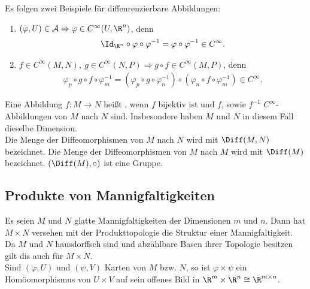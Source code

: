 \begin{bsp}
  Es folgen zwei Beispiele für diffenrenzierbare Abbildungen:
  \begin{enumerate}
  \item $(\varphi,U) \in \mathcal A \Rightarrow \varphi \in C^{\infty}(U,\R^n)$, denn
    \begin{align*}
      \Id_{\R^n}\circ \varphi \circ \varphi^{-1} = \varphi \circ \varphi^{-1} \in C^{\infty}.
    \end{align*}
  \item $f \in C^{\infty}(M,N), \ g \in C^{\infty}(N,P) \Rightarrow g \circ f \in C^{\infty}(M,P)$, denn
    \begin{align*}
      \varphi_p \circ g \circ f \circ \varphi^{-1}_m = (\varphi_p \circ g \circ \varphi_n^{-1}) \circ (\varphi_n \circ f \circ \varphi_m^{-1}) \in C^{\infty}.
    \end{align*}
  \end{enumerate}
\end{bsp}

\begin{dfn}[Diffeomorphismus]
  Eine Abbildung $f \colon M \to N$ heißt , wenn $f$ bijektiv ist und $f$, sowie $f^{-1}$ $C^{\infty}$-Abbildungen von $M$ nach $N$ sind. Insbesondere haben $M$ und $N$ in diesem Fall dieselbe Dimension.\\

Die Menge der Diffeomorphismen von $M$ nach $N$ wird mit $\Diff(M,N)$ bezeichnet. Die Menge der Diffeomorphismen von $M$ nach $M$ wird mit $\Diff(M)$ bezeichnet. $(\Diff(M), \circ)$ ist eine Gruppe.

\end{dfn}



\subsection{Produkte von Mannigfaltigkeiten}

Es seien $M$ und $N$ glatte Mannigfaltigkeiten der Dimensionen $m$ und $n$.
Dann hat $M \times N$ versehen mit der Produkttopologie die Struktur einer Mannigfaltigkeit.\\
Da $M$ und $N$ hausdorffsch sind und abzählbare Basen ihrer Topologie besitzen gilt dis auch für $M \times N$.\\

Sind $(\varphi, U)$ und $(\psi, V)$ Karten von $M$ bzw. $N$, so ist $\varphi \times \psi$ ein Homöomorphismus von $U \times V$ auf sein offenes Bild in $\R^m \times \R^n \cong \R^{m \times n}$.\\

